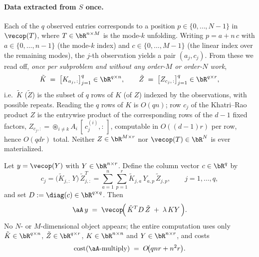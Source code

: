\paragraph{Data extracted from $S$ once.}
Each of the $q$ observed entries corresponds to a position $p\in\{0,\dots,N-1\}$
in $\vecop(T)$, where $T\in\bR^{n\times M}$ is the mode-$k$ unfolding. Writing
$p=a+n\,c$ with $a\in\{0,\dots,n-1\}$ (the mode-$k$ index) and
$c\in\{0,\dots,M-1\}$ (the linear index over the remaining modes), the $j$-th
observation yields a pair $(a_j,c_j)$. From these we read off, \emph{once per
subproblem and without any order-$M$ or order-$N$ work},
\begin{equation}\label{eq:tilde}
  \tilde K \;=\; \bigl[K_{a_j,\,:}\bigr]_{j=1}^{q}\in\bR^{q\times n},
  \qquad
  \tilde Z \;=\; \bigl[Z_{c_j,\,:}\bigr]_{j=1}^{q}\in\bR^{q\times r},
\end{equation}
i.e.\ $\tilde K$ ($\tilde Z$) is the subset of $q$ rows of $K$ (of $Z$) indexed
by the observations, with possible repeats. Reading the $q$ rows of $K$ is
$O(qn)$; row $c_j$ of the Khatri--Rao product $Z$ is the entrywise product of
the corresponding rows of the $d-1$ fixed factors,
$Z_{c_j,:}=\circledast_{i\neq k}A_i\,[\,c_j^{(i)},:\,]$, computable in
$O((d-1)r)$ per row, hence $O(qdr)$ total. Neither $Z\in\bR^{M\times r}$ nor
$\vecop(T)\in\bR^{N}$ is ever materialized.

\begin{lemma}\label{lem:matvec}
Let $y=\vecop(Y)$ with $Y\in\bR^{n\times r}$. Define the column vector
$c\in\bR^{q}$ by
\begin{equation}\label{eq:fwd}
  c_j=\bigl(\tilde K_{j,:}\,Y\bigr)\,\tilde Z_{j,:}^{T}
   =\sum_{a=1}^{n}\sum_{p=1}^{r}\tilde K_{j,a}\,Y_{a,p}\,\tilde Z_{j,p},
   \qquad j=1,\dots,q,
\end{equation}
and set $D:=\diag(c)\in\bR^{q\times q}$. Then
\begin{equation}\label{eq:Aaction}
  \aA\,y
  \;=\;\vecop\!\Bigl(\,\tilde K^{T} D\,\tilde Z \;+\; \lambda\,K Y\,\Bigr).
\end{equation}
No $N$- or $M$-dimensional object appears; the entire computation uses only
$\tilde K\in\bR^{q\times n}$, $\tilde Z\in\bR^{q\times r}$, $K\in\bR^{n\times n}$
and $Y\in\bR^{n\times r}$, and costs
\begin{equation}\label{eq:matveccost}
  \mathrm{cost}(\aA\text{-multiply})
  \;=\; O\!\bigl(qnr + n^{2}r\bigr).
\end{equation}
\end{lemma}

